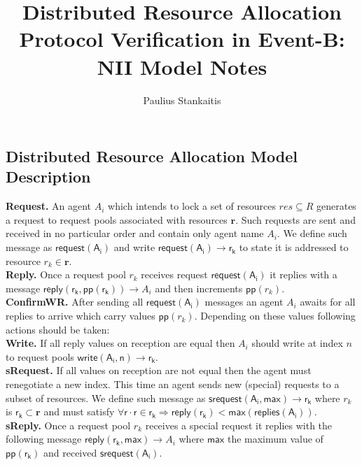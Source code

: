 \documentclass[10pt,a4paper]{report}
\begin{document}
	\title{Distributed Resource Allocation Protocol Verification in Event-B: \vspace{.5cm} \\ \large NII Model Notes}
	\author{Paulius Stankaitis}
	\date{}
	\maketitle
	
\subsection*{Distributed Resource Allocation Model Description}
	
	\noindent \textbf{Request.} An agent $A_i$ which intends to lock a set of resources $res \subseteq R$ generates a request to request pools associated with resources $\mathbf{r}$. Such requests are sent and received in no particular order and contain only agent name $A_i$. We define such message as $\mathsf{request(A_i)}$ and write $\mathsf{request(A_i) \rightarrow r_k}$ to state it is addressed to resource $r_k \in \mathbf{r}$. \\
	
	
	\noindent \textbf{Reply.} Once a request pool $r_k$ receives request $\mathsf{request(A_i)}$ it replies with a message $\mathsf{reply(\mathsf r_k, {pp}(r_k))} \rightarrow A_i$ and then increments $\mathsf{pp}(r_k)$. \\
	
	\noindent \textbf{ConfirmWR.} After sending all $\mathsf{request(A_i)}$ messages an agent $A_i$ awaits for all replies to arrive which carry values $\mathsf{pp}(r_k)$. Depending on these values following actions should be taken: \\
	
	\textbf{Write.} If all reply values on reception are equal then $A_i$ should write at index $n$ to request pools $\mathsf{write(A_i, n) \rightarrow r_k}$. \\
	
	\textbf{sRequest.} If all values on reception are not equal then the agent must renegotiate a new index. This time an agent sends new (special) requests to a subset of resources. We define such message as \textbf{$\mathsf{srequest(A_i, max) \rightarrow r_k}$} where $r_k$ is $\mathsf{r_k \subset \mathbf{r}}$ and must satisfy $\mathsf{\forall r \cdot r \in r_k \Rightarrow reply(r_k)} < \mathsf{max(replies(A_i))}$.  \\
	
	\textbf{sReply.}  Once a request pool $r_k$ receives a special request it replies with the following message $\mathsf{reply(\mathsf r_k, max)} \rightarrow A_i$ where $\mathsf{max}$ the maximum value of $\mathsf{pp(r_k)}$ and received $\mathsf{srequest(A_i)}$. \\
	
\end{document}
